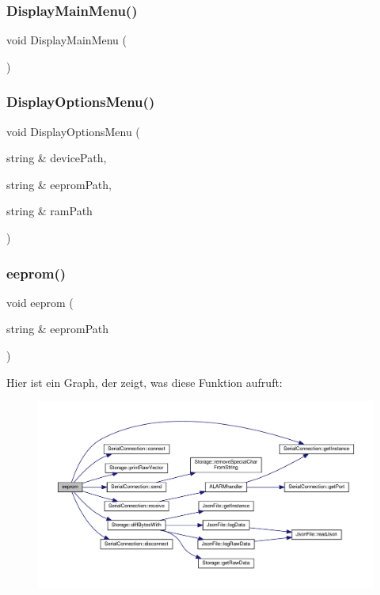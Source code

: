 \subsubsection{Display\+Main\+Menu()}
{\footnotesize\ttfamily void Display\+Main\+Menu (\begin{DoxyParamCaption}{ }\end{DoxyParamCaption})}

\mbox{\label{_jura_coffee_memory_8cpp_a97c243c8048c19a393f1e73c92af4918}} 
\subsubsection{Display\+Options\+Menu()}
{\footnotesize\ttfamily void Display\+Options\+Menu (\begin{DoxyParamCaption}\item[{string \&}]{device\+Path,  }\item[{string \&}]{eeprom\+Path,  }\item[{string \&}]{ram\+Path }\end{DoxyParamCaption})}

\mbox{\label{_jura_coffee_memory_8cpp_a7f8b7f6e1e79a9ca640e51eb5aea9127}} 
\subsubsection{eeprom()}
{\footnotesize\ttfamily void eeprom (\begin{DoxyParamCaption}\item[{string \&}]{eeprom\+Path }\end{DoxyParamCaption})}

Hier ist ein Graph, der zeigt, was diese Funktion aufruft\+:
\nopagebreak
\begin{figure}[H]
\begin{center}
\leavevmode
\includegraphics[width=350pt]{_jura_coffee_memory_8cpp_a7f8b7f6e1e79a9ca640e51eb5aea9127_cgraph}
\end{center}
\end{figure}
\mbox{\label{_jura_coffee_memory_8cpp_a0ddf1224851353fc92bfbff6f499fa97}} 
